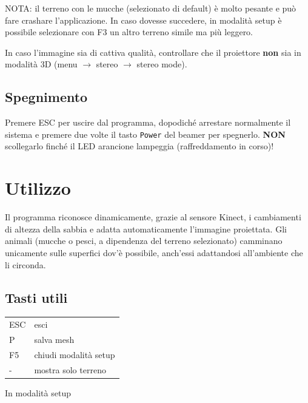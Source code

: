 \documentclass[12pt]{article}
\begin{document}
		NOTA: il terreno con le mucche (selezionato di default) è molto pesante e può fare crashare l'applicazione.
		In caso dovesse succedere, in modalità setup è possibile selezionare con F3 un altro terreno simile
		ma più leggero.
		
		In caso l'immagine sia di cattiva qualità, controllare
		che il proiettore \textbf{non} sia in modalità 3D (menu $\rightarrow$ stereo $\rightarrow$ stereo mode).\\


	\subsection{Spegnimento}
		
		Premere ESC per uscire dal programma, dopodiché arrestare normalmente il sistema e 
		premere due volte il tasto \texttt{Power} del beamer per spegnerlo. \textbf{NON} scollegarlo finché
		il LED arancione lampeggia (raffreddamento in corso)!
		
		
\section{Utilizzo}
		
	Il programma riconosce dinamicamente, grazie al sensore Kinect, i cambiamenti di altezza della sabbia
	e adatta automaticamente l'immagine proiettata. Gli animali (mucche o pesci, a dipendenza del terreno
	selezionato) camminano unicamente sulle superfici dov'è possibile, anch'essi adattandosi all'ambiente
	che li circonda.

	\subsection{Tasti utili}\label{sec:commands}
	
	\begin{tabular}{l l}
		ESC & esci\\
		P & salva mesh\\
		F5 & chiudi modalità setup\\
		- & mostra solo terreno\\
	\end{tabular}

	In modalità setup
\end{document}
